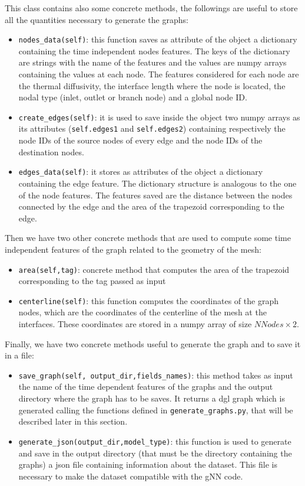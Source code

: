 \documentclass[11pt,a4paper]{article}
\begin{document}
This class contains also some concrete methods, the followings are useful to store all the quantities necessary to generate the graphs:
\begin{itemize}
    \item \texttt{nodes\_data(self)}: this function saves as attribute of the object a dictionary containing the time independent nodes features. The keys of the dictionary are strings with the name of the features and the values are numpy arrays containing the values at each node. The features considered for each node are the thermal diffusivity, the interface length where the node is located, the nodal type (inlet, outlet or branch node) and a global node ID.
    \item \texttt{create\_edges(self)}: it is used to save inside the object two numpy arrays as its attributes (\texttt{self.edges1} and \texttt{self.edges2}) containing respectively the node IDs of the source nodes of every edge and the node IDs of the destination nodes.
    \item \texttt{edges\_data(self)}: it stores as attributes of the object a dictionary containing the edge feature. The dictionary structure is analogous to the one of the node features. The features saved are the distance between the nodes connected by the edge and the area of the trapezoid corresponding to the edge.
\end{itemize}

Then we have two other concrete methods that are used to compute some time independent features of the graph related to the geometry of the mesh:
\begin{itemize}
    \item \texttt{area(self,tag)}: concrete method that computes the area of the trapezoid corresponding to the tag passed as input 
    \item \texttt{centerline(self)}: this function computes the coordinates of the graph nodes, which are the coordinates of the centerline of the mesh at the interfaces. These coordinates are stored in a numpy array of size \(NNodes \times 2\).
\end{itemize}

Finally, we have two concrete methods useful to generate the graph and to save it in a file:
\begin{itemize}
    \item \texttt{save\_graph(self, output\_dir,fields\_names)}: this method takes as input the name of the time dependent features of the graphs and the output directory where the graph has to be saves. It returns a dgl graph which is generated calling the functions defined in \texttt{generate\_graphs.py}, that will be described later in this section. 
    \item \texttt{generate\_json(output\_dir,model\_type)}: this function is used to generate and save in the output directory (that must be the directory containing the graphs) a json file containing information about the dataset. This file is necessary to make the dataset compatible with the gNN code. 
\end{itemize}
\end{document}
